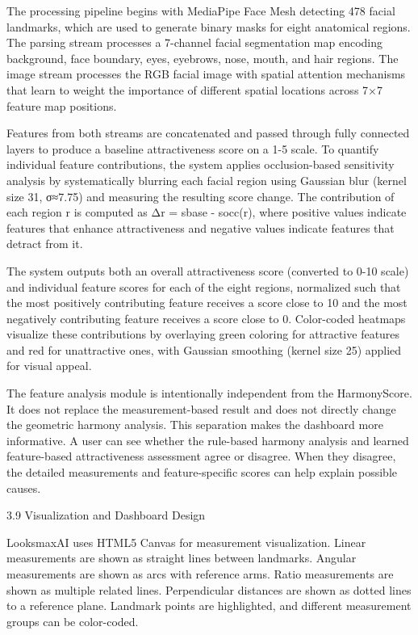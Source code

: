 The processing pipeline begins with MediaPipe Face Mesh detecting 478 facial landmarks, which are used to generate binary masks for eight anatomical regions. The parsing stream processes a 7-channel facial segmentation map encoding background, face boundary, eyes, eyebrows, nose, mouth, and hair regions. The image stream processes the RGB facial image with spatial attention mechanisms that learn to weight the importance of different spatial locations across 7×7 feature map positions.

Features from both streams are concatenated and passed through fully connected layers to produce a baseline attractiveness score on a 1-5 scale. To quantify individual feature contributions, the system applies occlusion-based sensitivity analysis by systematically blurring each facial region using Gaussian blur (kernel size 31, σ≈7.75) and measuring the resulting score change. The contribution of each region r is computed as Δr = sbase - socc(r), where positive values indicate features that enhance attractiveness and negative values indicate features that detract from it.

The system outputs both an overall attractiveness score (converted to 0-10 scale) and individual feature scores for each of the eight regions, normalized such that the most positively contributing feature receives a score close to 10 and the most negatively contributing feature receives a score close to 0. Color-coded heatmaps visualize these contributions by overlaying green coloring for attractive features and red for unattractive ones, with Gaussian smoothing (kernel size 25) applied for visual appeal.

The feature analysis module is intentionally independent from the HarmonyScore. It does not replace the measurement-based result and does not directly change the geometric harmony analysis. This separation makes the dashboard more informative. A user can see whether the rule-based harmony analysis and learned feature-based attractiveness assessment agree or disagree. When they disagree, the detailed measurements and feature-specific scores can help explain possible causes.

3.9  Visualization and Dashboard Design

LooksmaxAI uses HTML5 Canvas for measurement visualization. Linear measurements are shown as straight lines between landmarks. Angular measurements are shown as arcs with reference arms. Ratio measurements are shown as multiple related lines. Perpendicular distances are shown as dotted lines to a reference plane. Landmark points are highlighted, and different measurement groups can be color-coded.

